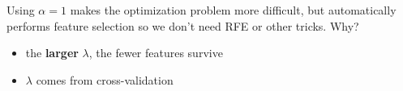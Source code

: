 Using $\alpha =1$ makes the optimization problem more difficult, but automatically performs feature selection so we don't need RFE or other tricks. Why?
\begin{center}

\end{center}
\begin{itemize}
\pause{}
\item the \textbf{larger}  $\lambda$, the fewer features survive
\pause{}
\item $\lambda$ comes from cross-validation
\end{itemize}